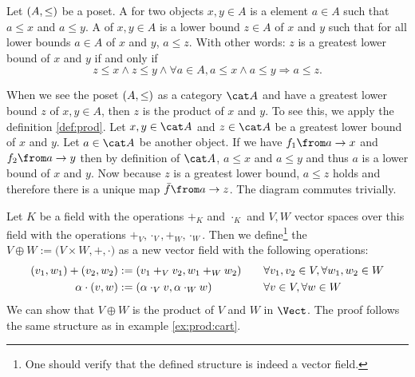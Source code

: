 \begin{example}[Posets]
  \label{ex:prod:poset}
  Let $\left( A , \le \right)$ be a poset.
  A  for two objects $x, y \in A$ is a element $a \in A$ such that $a \le x$ and $a \le y$.
  A  of $x, y \in A$ is a lower bound $z \in A$ of $x$ and $y$ such that for all lower bounds $a \in A$ of $x$ and $y$, $a \le z$.
  With other words: $z$ is a greatest lower bound of $x$ and $y$ if and only if
  $$z \le x \land z \le y \land \forall a \in A, a \le x \land a \le y \Rightarrow a \le z.$$

  When we see the poset $\left( A , \le \right)$ as a category $\catA$ and have a greatest lower bound $z$ of $x, y \in A$, then $z$ is the product of $x$ and $y$.
  To see this, we apply the definition \ref{def:prod}.
  Let $x, y \in \catA$ and $z \in \catA$ be a greatest lower bound of $x$ and $y$.
  Let $a \in \catA$ be another object.
  If we have $f_1 \from a \to x$ and $f_2 \from a \to y$ then by definition of $\catA$, $a \le x$ and $a \le y$ and thus $a$ is a lower bound of $x$ and $y$.
  Now because $z$ is a greatest lower bound, $a \le z$ holds and therefore there is a unique map $\fbar \from a \to z$.
  The diagram commutes trivially.
\end{example}

\begin{example}
  \label{ex:prod:vspace}
  Let $K$ be a field with the operations $+_K$ and $\cdot_K$ and $V, W$ vector spaces over this field with the operations $+_V, \cdot_V, +_W, \cdot_W$.
  Then we define\footnote{One should verify that the defined structure is indeed a vector field.}
  the  $V \oplus W := \bigl(V \times W, +, \cdot \bigr)$ as a new vector field with the following operations:
  \begin{alignat*}{4}
    \left( v_1 , w_1 \right) + \left( v_2 , w_2 \right) &:= \left( v_1 +_V v_2 , w_1 +_W w_2 \right)           &\quad& \forall v_1, v_2 \in V, \forall w_1, w_2 \in W \\
    \alpha \cdot \left( v , w \right)          &:= \left( \alpha \cdot_V v , \alpha \cdot_W w \right) &     & \forall v \in V, \forall w \in W
  \end{alignat*}
  We can show that $V \oplus W$ is the product of $V$ and $W$ in $\Vect$.
  The proof follows the same structure as in example \ref{ex:prod:cart}.
\end{example}


